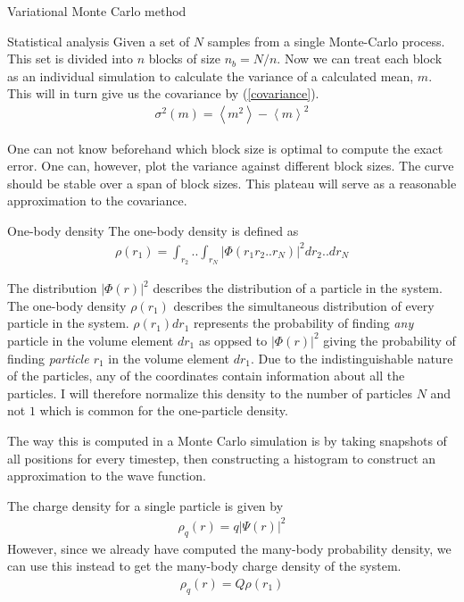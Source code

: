 \documentclass[a4paper, 12pt, titlepage]{article}
\begin{document}
\begin{section}{Variational Monte Carlo method}
\begin{subsection}{Statistical analysis}
 Given a set of $N$ samples from a single Monte-Carlo process. This set is divided into $n$ blocks of size $n_b = N/n$. Now we can treat each block as an individual simulation to calculate the variance of a calculated mean, $m$. This will in turn give us the covariance by (\ref{covariance}).
 \begin{align*}
 	\sigma^2 (m) = \left<m^2\right> - \left<m\right>^2 
 \end{align*}

 One can not know beforehand which block size is optimal to compute the exact error. One can, however, plot the variance against different block sizes. The curve should be stable over a span of block sizes. This plateau will serve as a reasonable approximation to the covariance. 
 \end{subsection}
 \begin{subsection}{One-body density}
 	The one-body density is defined as
 \begin{align*}
 	\rho(r_1) = \int_{r_2} .. \int_{r_N} | \Phi(r_1 r_2 .. r_N) |^2 dr_2 .. dr_N
 \end{align*}

 The distribution $|\Phi(r)|^2$ describes the distribution of a particle in the system. The one-body density $\rho(r_1)$ describes the simultaneous distribution of every particle in the system. $\rho(r_1) dr_1 $ represents the probability of finding \textit{any} particle in the volume element $dr_1$ as oppsed to $|\Phi(r)|^2$ giving the probability of finding \textit{particle $r_1$} in the volume element $dr_1$. Due to the indistinguishable nature of the particles, any of the coordinates contain information about all the particles. I will therefore normalize this density to the number of particles $N$ and not $1$ which is common for the one-particle density. 

 The way this is computed in a Monte Carlo simulation is by taking snapshots of all positions for every timestep, then constructing a histogram to construct an approximation to the wave function.

 The charge density for a single particle is given by 
 \begin{align*}
 	\rho_q (r) = q |\Psi(r)|^2
 \end{align*}
 However, since we already have computed the many-body probability density, we can use this instead to get the many-body charge density of the system. 
 \begin{align*}
 	\rho_q (r) = Q \rho(r_1)
 \end{align*}
 \end{subsection}

\end{section}
\end{document}
